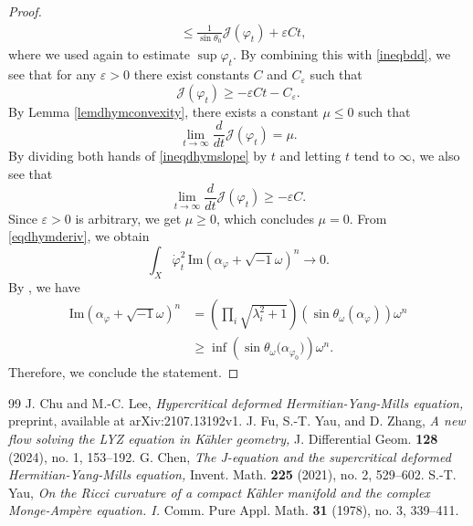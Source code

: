 \documentclass[10pt,a4paper]{amsart}
\begin{document}
\begin{proof}
\begin{align*}
        &\le\frac{1}{\sin{\theta_0}}\mathcal{J}(\varphi_t)+\varepsilon C t,
    \end{align*}
    where we used \cite[Lemma 3.2]{FYZ} again to estimate $\sup\varphi_t$.
    By combining this with \eqref{ineqbdd}, we see that for any $\varepsilon>0$ there exist constants $C$ and $C_\varepsilon$ such that
    \begin{equation}\label{ineqdhymslope}
        \mathcal{J}(\varphi_t)\ge -\varepsilon C t-C_\varepsilon.
    \end{equation}
    By Lemma \ref{lemdhymconvexity}, there exists a constant $\mu\le0$ such that
    $$\lim_{t\rightarrow\infty}\frac{d}{dt}\mathcal{J}(\varphi_t)=\mu.$$
    By dividing both hands of \eqref{ineqdhymslope} by $t$ and letting $t$ tend to $\infty$, we also see that
    $$\lim_{t\rightarrow\infty}\frac{d}{dt}\mathcal{J}(\varphi_t)\ge - \varepsilon C.$$
    Since $\varepsilon>0$ is arbitrary, we get $\mu\ge0$, which concludes $\mu=0$. From \eqref{eqdhymderiv}, we obtain
    $$\int_X \dot{\varphi}_t^2 \, \mathrm{Im}(\alpha_\varphi+\sqrt{-1}\omega)^n \rightarrow0.$$
    By \cite[Lemma 3.2]{FYZ}, we have
    \begin{align*}
        \mathrm{Im}(\alpha_\varphi+\sqrt{-1}\omega)^n
        &=\left(\prod_i\sqrt{\lambda_i^2+1}\right)\left(\sin{\theta_\omega(\alpha_\varphi)}\right)\omega^n\\
        &\ge \inf\left(\sin{\theta_\omega(\alpha_{\varphi_0}})\right) \omega^n.
    \end{align*}    
    Therefore, we conclude the statement.
\end{proof}

\begin{thebibliography}{99}
 J. Chu and M.-C. Lee, \textit{Hypercritical deformed Hermitian-Yang-Mills equation,} preprint, available at arXiv:2107.13192v1.
 J. Fu, S.-T. Yau, and D. Zhang, \textit{A new flow solving the LYZ equation in Kähler geometry,} J. Differential Geom. \textbf{128} (2024), no. 1, 153--192.
 G. Chen, \textit{The J-equation and the supercritical deformed Hermitian-Yang-Mills equation,} Invent. Math. \textbf{225} (2021), no. 2, 529--602.
 S.-T. Yau, \textit{On the Ricci curvature of a compact Kähler manifold and the complex Monge-Ampère equation. I.} Comm. Pure Appl. Math. \textbf{31} (1978), no. 3, 339--411.
\end{thebibliography}
\end{document}
